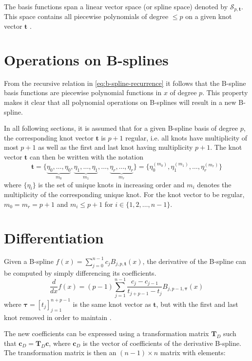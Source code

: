 The basis functions span a linear vector space (or spline space) denoted by $\mathcal{S}_{p, \mathbf{t}}$. This space contains all piecewise polynomials of degree $\le p$ on a given knot vector $\mathbf t$ \citep{Grimstad2016}. 

\section{Operations on B-splines}
From the recursive relation in \cref{eq:b-spline-recurrence} it follows that the B-spline basis functions are piecewise polynomial functions in $x$ of degree $p$. This property makes it clear that all polynomial operations on B-splines will result in a new B-spline.

In all following sections, it is assumed that for a given B-spline basis of degree $p$, the corresponding knot vector $\mathbf t$ is $p+1$ regular, i.e. all knots have multiplicity of most $p+1$ as well as the first and last knot having multiplicity $p+1$. The knot vector $\mathbf t$ can then be written with the notation 
\begin{equation}\label{eq:regular-knot-vector}
    \mathbf t = \{\underbrace{\eta_0, \dots, \eta_0}_{m_0}, \underbrace{\eta_1, \dots, \eta_1}_{m_1}, \dots, \underbrace{\eta_{r}, \dots, \eta_{r}}_{m_r}\} = \{\eta_0^{(m_0)}, \eta_1^{(m_1)}, \dots, \eta_r^{(m_r)}\}
\end{equation}
where $\{\eta_i\}$ is the set of unique knots in increasing order and $m_i$ denotes the multiplicity of the corresponding unique knot. For the knot vector to be regular, $m_0 = m_r = p+1$ and $m_i \leq p+1$ for $i \in \{1,2,\ldots,n-1\}$.

\section{Differentiation}\label{sec:derivative}
Given a B-spline $f(x) = \sum_{j=0}^{n-1} c_j B_{j, p, \mathbf{t}}(x)$,
the derivative of the B-spline can be computed by simply differencing its coefficients. 
\begin{equation}\label{eq:b-spline-derivative}
    \frac{d}{dx} f(x) = (p-1) \sum_{j=1}^{n-1} \frac{c_j-c_{j-1}}{t_{j+p-1}-t_j} B_{j, p-1, \boldsymbol{\tau}}(x)
\end{equation}
where $\boldsymbol{\tau} = [t_j]_{j=1}^{n+p-1}$ is the same knot vector as $\mathbf{t}$, but with the first and last knot removed in order to maintain .

The new coefficients can be expressed using a transformation matrix $\mathbf T_D$ such that $\mathbf{c}_D = \mathbf T_D \mathbf{c}$, where $\mathbf{c}_D$ is the vector of coefficients of the derivative B-spline. The transformation matrix is then an $(n-1) \times n$ matrix with elements:

